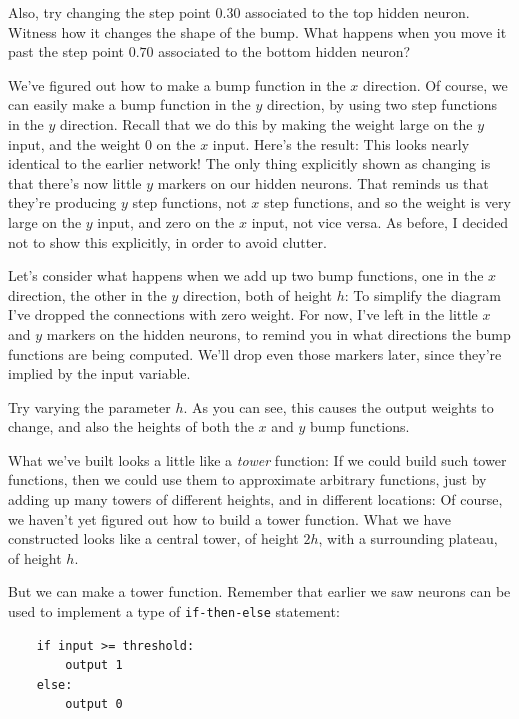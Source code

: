Also, try changing the step point $0.30$ associated to the top hidden neuron. Witness how it changes the shape of the bump. What happens when you move it past the step point $0.70$ associated to the bottom hidden neuron?


We've figured out how to make a bump function in the $x$ direction. Of course, we can easily make a bump function in the $y$ direction, by using two step functions in the $y$ direction. Recall that we do this by making the weight large on the $y$ input, and the weight $0$ on the $x$ input. Here's the result: This looks nearly identical to the earlier network! The only thing explicitly shown as changing is that there's now little $y$ markers on our hidden neurons. That reminds us that they're producing $y$ step functions, not $x$ step functions, and so the weight is very large on the $y$ input, and zero on the $x$ input, not vice versa. As before, I decided not to show this explicitly, in order to avoid clutter.


Let's consider what happens when we add up two bump functions, one in the $x$ direction, the other in the $y$ direction, both of height $h$: To simplify the diagram I've dropped the connections with zero weight. For now, I've left in the little $x$ and $y$ markers on the hidden neurons, to remind you in what directions the bump functions are being computed. We'll drop even those markers later, since they're implied by the input variable.


Try varying the parameter $h$. As you can see, this causes the output weights to change, and also the heights of both the $x$ and $y$ bump functions.


What we've built looks a little like a \emph{tower} function: If we could build such tower functions, then we could use them to approximate arbitrary functions, just by adding up many towers of different heights, and in different locations: Of course, we haven't yet figured out how to build a tower function. What we have constructed looks like a central tower, of height $2h$, with a surrounding plateau, of height $h$.


But we can make a tower function. Remember that earlier we saw neurons can be used to implement a type of \texttt{if-then-else} statement:



\begin{lstlisting}
    if input >= threshold: 
        output 1
    else:
        output 0

\end{lstlisting}


